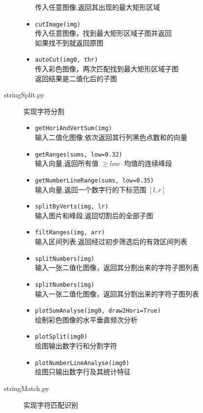 \documentclass{ctexart}
\begin{document}
\begin{description}
\begin{itemize}
        传入任意图像,返回其出现的最大矩形区域
        \item \verb|cutImage(img)| \\
        传入任意图像，找到最大矩形区域子图并返回\\
        如果找不到就返回原图
        \item \verb|autoCut(img0, thr)| \\
        传入彩色图像，两次匹配找到最大矩形区域子图\\
        返回结果是二值化后的子图
    \end{itemize}
    \item[stringSplit.py] 实现字符分割
    \begin{itemize}
        \item \verb|getHoriAndVertSum(img)| \\
        输入二值化图像,依次返回其行列黑色点数和的向量
        \item \verb|getRanges(sums, low=0.32)| \\
        输入向量,返回所有值 $\ge low \cdot$均值的连续峰段
        \item \verb|getNumberLineRange(sums, low=0.35)| \\
        输入向量,返回一个数字行的下标范围 $[l,r]$
        \item \verb|splitByVerts(img, lr)| \\
        输入图片和峰段,返回切割后的全部子图
        \item \verb|filtRanges(img, arr)| \\
        输入区间列表,返回经过初步筛选后的有效区间列表
        \item \verb|splitNumbers(img)| \\
        输入一张二值化图像，返回其分割出来的字符子图列表
        \item \verb|splitNumbers(img)| \\
        输入一张二值化图像，返回其分割出来的字符子图列表
        \item \verb|plotSumAnalyse(img0, draw2Hori=True)| \\
        绘制彩色图像的水平垂直频次分析
        \item \verb|plotSplit(img0)| \\
        绘图输出数字行和分割字符
        \item \verb|plotNumberLineAnalyse(img0)| \\
        绘图只输出数字行及其统计特征
    \end{itemize}
    \item[stringMatch.py] 实现字符匹配识别

\end{description}
\end{document}
